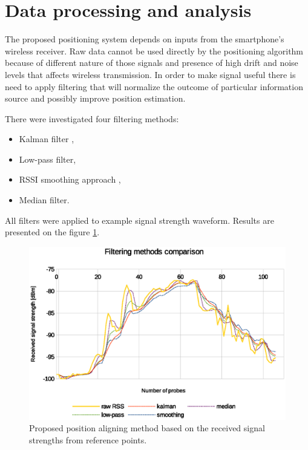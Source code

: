 \documentclass[../main.tex]{subfiles}
\begin{document}

\section{Data processing and analysis} %
\label{sec:data_processing}

The proposed positioning system depends on inputs from the smartphone's wireless receiver. Raw data cannot be used directly by the positioning algorithm because of different nature of those signals and presence of high drift and noise levels that affects wireless transmission. In order to make signal useful there is need to apply filtering that will normalize the outcome of particular information source and possibly improve position estimation.

There were investigated four filtering methods:
\begin{itemize}
	\item Kalman filter \cite{article_rss_kalman},
	\item Low-pass filter,
	\item RSSI smoothing approach \cite{rssi_smoothing},
	\item Median filter.
\end{itemize}

All filters were applied to example signal strength waveform. Results are presented on the figure \ref{fig:filtering_comparison}.

\begin{figure}[!htbp]
\includegraphics[width=\textwidth]{pictures/filtering_comparison}
\centering
\caption{Proposed position aligning method based on the received signal strengths from reference points.}
\label{fig:filtering_comparison}
\end{figure}
\end{document}
